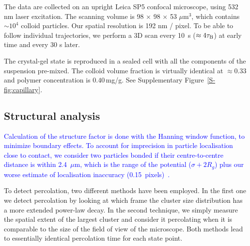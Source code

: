 \documentclass[preprint,amsmath,amssymb,superscriptaddress]{revtex4-1}
\begin{document}
The data are collected on an upright Leica SP5 confocal microscope, using 532 nm laser excitation. The scanning volume is 98 $\times$ 98 $\times$ 53 $\mu$m$^3$, which contains $\sim 10^4$ colloid particles. Our spatial resolution is 192 nm / pixel. To be able to follow individual trajectories, we perform a 3D scan every 10~s ($\approx 4\tau_{\rm B}$) at early time and every 30 s later.


The crystal-gel state is reproduced in a sealed cell with all the components of the suspension pre-mixed. The colloid volume fraction is virtually identical at $\approx 0.33$ and polymer concentration is $0.40\,$mg/g. See Supplementary Figure~\ref{S-fig:capillary}.





%

\subsection*{Structural analysis}

\textcolor{blue}{Calculation of the structure factor is done with the Hanning window function, to minimize boundary effects. To account for imprecision in particle localisation close to contact, we consider two particles bonded if their centre-to-centre distance is within 2.4~$\mu$m, which is the range of the potential ($\sigma+2R_g$) plus our worse estimate of localisation inaccuracy (0.15~pixels)~\cite{Leocmach2013}.}

To detect percolation, two different methods have been employed. In the first one we detect percolation by looking at which frame the cluster size distribution has a more extended power-law decay. 
In the second technique, we simply measure the spatial extent of the largest cluster and consider it percolating when it is comparable to the size of the field of view of the microscope. 
Both methods lead to essentially identical percolation time for each state point.
\end{document}
